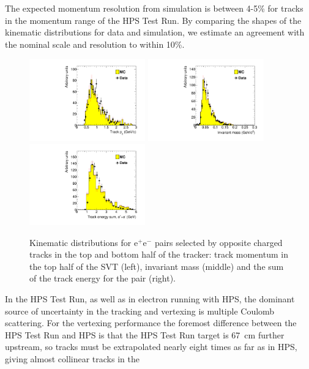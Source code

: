 \documentclass[final,3p,times,twocolumn]{elsarticle}
\newcommand{\ee}{e$^+$e$^-$}
\begin{document}
The expected momentum resolution from simulation is between 4-5\% for tracks in the momentum 
range of the HPS Test Run. By comparing the shapes of the kinematic distributions for data and simulation, we 
estimate an agreement with the nominal scale and resolution to within 10\%.
 \begin{center}
\begin{figure}[t]
\includegraphics[width=5cm]{h_trk_top_px_h_trk_top_px_trigsel4hit_pair1351_twotrkfilt-v6-paper-mod}
\includegraphics[width=5cm]{h_invM_h_invM_trigsel4hit_pair1351_twotrkfilt-v6-paper-mod}
\includegraphics[width=5cm]{h_sumE_h_sumE_trigsel4hit_pair1351_twotrkfilt-v6-paper}
\caption{\small Kinematic distributions for \ee{} pairs selected by opposite charged tracks in the top and bottom half of the tracker: track momentum in the top half of the SVT (left), invariant mass (middle) and the sum of the track energy for the pair (right). 
\label{fig:pair_kin}}
\end{figure}
\end{center}
In the HPS Test Run, as well as in electron running with HPS, the dominant source of uncertainty in the 
tracking and vertexing is multiple Coulomb scattering. For the vertexing performance the foremost 
difference between the HPS Test Run and HPS is that the HPS Test Run target is 67~cm further upstream, 
so tracks must be extrapolated nearly eight times as far as in HPS, giving almost collinear tracks in the 
\end{document}
